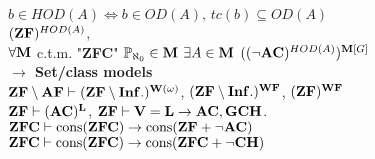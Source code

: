 \documentclass[9pt]{article}
\newcommand{\class}[1]{{\bf #1}}
\newcommand{\Pp}{\mathbb{P}}
\newcommand{\mytitle}[1]{ {\bf $\rightarrow$ #1}\\}
\newcommand{\V}{\class{V}}
\newcommand{\M}{\class{M}}
\newcommand{\WF}{\class{WF}}
\begin{document}
\begin{multicols*}{2}
$b\in HOD(A)\Leftrightarrow b\in OD(A),\,tc(b)\subseteq OD(A)$\\
$(\class{ZF})^{HOD(A)}$,\\
$\forall \M$ c.t.m. "\class{ZFC}" $\Pp_{\aleph_0}\in\M$ $\exists A\in \M$ $((\neg\class{AC})^{HOD(A)})^{\M[G]}$\\
\mytitle{Set/class models}
$\class{ZF}\setminus \class{AF}\vdash (\class{ZF}\setminus \class{Inf.})^{\class{W}(\omega)}$, $(\class{ZF}\setminus \class{Inf.})^\WF$, $(\class{ZF})^\WF$\\
$\class{ZF}\vdash (\class{AC})^{\class{L}}$, $\class{ZF}\vdash \V=\class{L}\to \class{AC}, \class{GCH}$.\\
$\class{ZFC}\vdash \mbox{cons}(\class{ZFC})\to \mbox{cons}(\class{ZF}+\neg\class{AC})$\\
$\class{ZFC}\vdash \mbox{cons}(\class{ZFC})\to \mbox{cons}(\class{ZFC}+\neg \class{CH})$
\end{multicols*}
\end{document}
